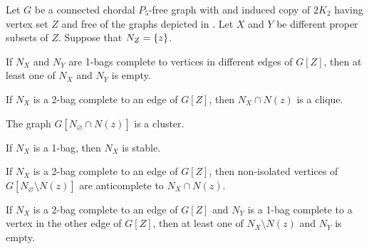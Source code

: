 \begin{lemma}
    Let $G$ be a connected chordal $P_5$-free graph with and induced copy of
    $2K_2$ having vertex set $Z$ and free of the graphs depicted in
    . Let $X$ and $Y$ be different proper
    subsets of $Z$. Suppose that $N_Z=\left\{z\right\}$.
    \begin{lemenum}
        \item If $N_X$ and $N_Y$ are 1-bags complete to vertices in different
            edges of $G[Z]$, then at least one of $N_X$ and $N_Y$ is empty.
            \label{lem:chordal_types_5}
        \item If $N_X$ is a 2-bag complete to an edge of $G[Z]$, then $N_X \cap
            N(z)$ is a clique. \label{lem:chordal_types_K_clique}
        \item The graph $G[N_\varnothing \cap N(z)]$ is a cluster.
            \label{lem:chordal_types_K_cluster}
        \item If $N_X$ is a 1-bag, then $N_X$ is stable.
            \label{lem:chordal_types_4}
        \item If $N_X$ is a 2-bag complete to an edge of $G[Z]$, then
            non-isolated vertices of $G[N_\varnothing \setminus N(z)]$ are
            anticomplete to $N_X \cap N(z)$.
            \label{lem:chordal_types_trivial}
        \item If $N_X$ is a 2-bag complete to an edge of $G[Z]$ and $N_Y$ is a
            1-bag complete to a vertex in the other edge of $G[Z]$, then at
            least one of $N_{X} \setminus N(z)$ and $N_Y$ is empty.
            \label{lem:chordal_types_empty}
    \end{lemenum}
\end{lemma}

